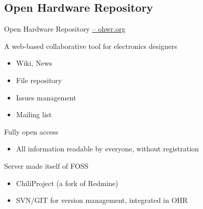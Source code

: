 \documentclass[compress,red]{beamer}
\begin{document}
\subsection{Open Hardware Repository}

\begin{frame}{Open Hardware Repository \href{http://ohwr.org}{-- ohwr.org}}
	\begin{block}{A web-based collaborative tool for electronics designers}
   \begin{itemize}
	\item Wiki, News
	\item File repository
	\item Issues management
	\item Mailing list
   \end{itemize}
	\end{block}

	\begin{block}{Fully open access}
 \begin{itemize}
	  \item 	All information readable by everyone, without registration
\end{itemize}
	\end{block}

	\begin{block}{Server made itself of FOSS}
   \begin{itemize}
	  \item ChiliProject (a fork of Redmine)
	  \item SVN/GIT for version management, integrated in OHR
   \end{itemize}
	\end{block}
\end{frame}



\end{document}
